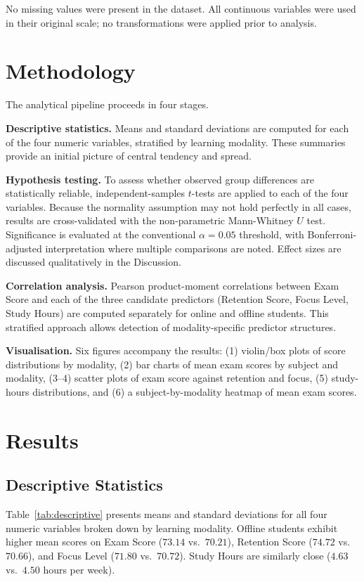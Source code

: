 \documentclass[11pt]{article}
\begin{document}
No missing values were present in the dataset.
All continuous variables were used in their original scale; no transformations
were applied prior to analysis.

\section{Methodology}

The analytical pipeline proceeds in four stages.

\textbf{Descriptive statistics.}
Means and standard deviations are computed for each of the four numeric variables,
stratified by learning modality.
These summaries provide an initial picture of central tendency and spread.

\textbf{Hypothesis testing.}
To assess whether observed group differences are statistically reliable,
independent-samples $t$-tests are applied to each of the four variables.
Because the normality assumption may not hold perfectly in all cases, results are
cross-validated with the non-parametric Mann-Whitney $U$ test.
Significance is evaluated at the conventional $\alpha = 0.05$ threshold, with
Bonferroni-adjusted interpretation where multiple comparisons are noted.
Effect sizes are discussed qualitatively in the Discussion.

\textbf{Correlation analysis.}
Pearson product-moment correlations between Exam Score and each of the three
candidate predictors (Retention Score, Focus Level, Study Hours) are computed
separately for online and offline students.
This stratified approach allows detection of modality-specific predictor structures.

\textbf{Visualisation.}
Six figures accompany the results:
(1) violin/box plots of score distributions by modality,
(2) bar charts of mean exam scores by subject and modality,
(3--4) scatter plots of exam score against retention and focus,
(5) study-hours distributions, and
(6) a subject-by-modality heatmap of mean exam scores.

\section{Results}

\subsection{Descriptive Statistics}

Table~\ref{tab:descriptive} presents means and standard deviations for all four
numeric variables broken down by learning modality.
Offline students exhibit higher mean scores on Exam Score ($73.14$ vs.\ $70.21$),
Retention Score ($74.72$ vs.\ $70.66$), and Focus Level ($71.80$ vs.\ $70.72$).
Study Hours are similarly close ($4.63$ vs.\ $4.50$ hours per week).
\end{document}
